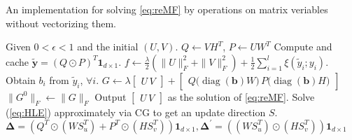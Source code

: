 \documentclass[11pt,twoside]{article}
\newcommand{\bsym}[1]{\ensuremath{\boldsymbol{#1}}}
\newcommand{\pointprod}[2]{\ensuremath{\left( #1 \operatorname{\prescript{}{\cdot}{\ast}} #2 \right)}}
\DeclareMathOperator*{\diag}{diag}
\begin{document}
\clearpage\newpage
\begin{algorithm}
    \caption{An implementation for solving \eqref{eq:reMF} by operations on matrix veriables without vectorizing them.}
    \label{alg:LrFramework}
    \begin{algorithmic}[1]
        \State Given $0< \epsilon < 1$ and the initial $(U,V)$.
        \State $Q \gets VH^T$, $P \gets UW^T$
        \State Compute and cache $\bsym{\tilde{y}}= (Q \odot P)^T\bsym{1}_{d\times 1}$.
        \State $f \gets \frac{\lambda}{2}(\|U\|_F^2 + \|V\|_F^2) + \frac{1}{2}\sum_{i=1}^l \xi(\tilde{y}_i;y_i)$.
            \State Obtain $b_i$ from $\tilde{y}_i$, $\forall i$.
            \State $G \gets \lambda \begin{bmatrix} U \, V \end{bmatrix} + \begin{bmatrix} Q \bigl(\diag(\bsym{b}) W \bigr) \, P \bigl ( \diag(\bsym{b}) H \bigr) \end{bmatrix}$
                \State $\|G^0\|_F \gets \|G\|_F$
            \EndIf
                \State Output $\begin{bmatrix} U \, V \end{bmatrix}$ as the solution of \eqref{eq:reMF}.
            \EndIf
            \State Solve (\ref{eq:HLE}) approximately via CG to get an update direction $S$.
            \State $\bsym{{\Delta}} = \left( Q^T \odot (WS_u^T)+ P^T\odot (HS_v^T) \right)\bsym{1}_{d\times 1}, \bsym{{\Delta}}^\prime = \left( (WS_u^T) \odot (HS_v^T) \right)\bsym{1}_{d\times 1}$

\end{algorithmic}
\end{algorithm}
\end{document}
